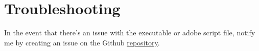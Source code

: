 \section*{Troubleshooting}
In the event that there's an issue with the executable or adobe script file, notify me by creating an issue on the Github \href{https://github.com/MichOchieng/icsParser/issues}{repository}.